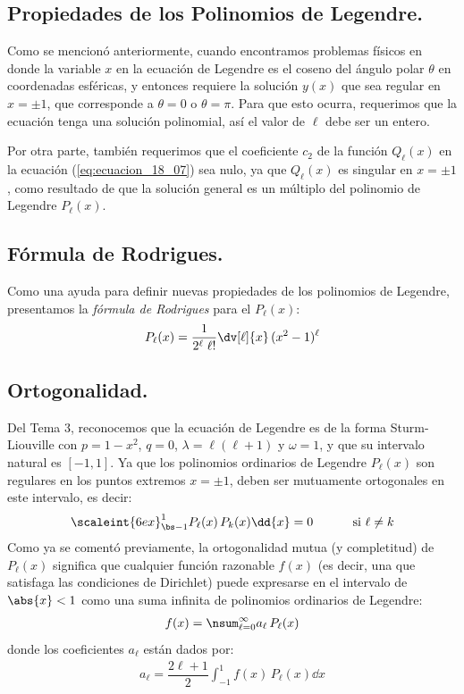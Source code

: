 \subsection{Propiedades de los Polinomios de Legendre.}

Como se mencionó anteriormente, cuando encontramos problemas físicos en donde la variable $x$ en la ecuación de Legendre es el coseno del ángulo polar $\theta$ en coordenadas esféricas, y entonces requiere la solución $y (x)$ que sea regular en $x = \pm 1$, que corresponde a $\theta = 0$ o $\theta = \pi$. Para que esto ocurra, requerimos que la ecuación tenga una solución polinomial, así el valor de $\ell$ debe ser un entero.
\par
Por otra parte, también requerimos que el coeficiente $c_{2}$ de la función $Q_{\ell}(x)$ en la ecuación (\ref{eq:ecuacion_18_07}) sea nulo, ya que $Q_{\ell} (x)$ es singular en $x = \pm 1$, como resultado de que la solución general es un múltiplo del polinomio de Legendre $P_{\ell} (x)$.

\subsection{Fórmula de Rodrigues.}

Como una ayuda para definir nuevas propiedades de los polinomios de Legendre, presentamos la \emph{fórmula de Rodrigues} para el $P_{\ell} (x)$:
\begin{align}
P_{\ell} (x) = \dfrac{1}{2^{\ell} \; \ell !} \dv[\ell]{x} \, (x^{2} - 1)^{\ell}
\label{eq:ecuacion_18_09}
\end{align}

\subsection{Ortogonalidad.}

Del Tema 3, reconocemos que la ecuación de Legendre es de la forma Sturm-Liouville con $p = 1 - x^{2}$, $q = 0$, $\lambda = \ell (\ell + 1)$ y $\omega = 1$, y que su intervalo natural es $[-1, 1]$. Ya que los polinomios ordinarios de Legendre $P_{\ell} (x)$ son regulares en los puntos extremos $x = \pm 1$, deben ser mutuamente ortogonales en este intervalo, es decir:
\begin{align}
\scaleint{6ex}_{\bs -1}^{1} P_{\ell}(x) \, P_{k}(x) \dd{x} = 0 \hspace{1cm} \mbox{ si $\ell \neq k$}
\label{eq:ecuacion_18_12}
\end{align}
Como ya se comentó previamente, la ortogonalidad mutua (y completitud) de $P_{\ell} (x)$ significa que cualquier función razonable $f (x)$ (es decir, una que satisfaga las condiciones de Dirichlet) puede expresarse en el intervalo de $\abs{x} < 1$ como una suma infinita de polinomios ordinarios de Legendre:
\begin{align}
f (x) = \nsum_{\ell = 0}^{\infty} a_{\ell} \, P_{\ell} (x)
\label{eq:ecuacion_013}
\end{align}
donde los coeficientes $a_{\ell}$ están dados por:
\begin{align}
a_{\ell} = \dfrac{2 \ell + 1}{2} \int_{-1}^{1} f(x) \, P_{\ell} (x) \dd{x}
\label{eq:ecuacion_18_14}
\end{align}

